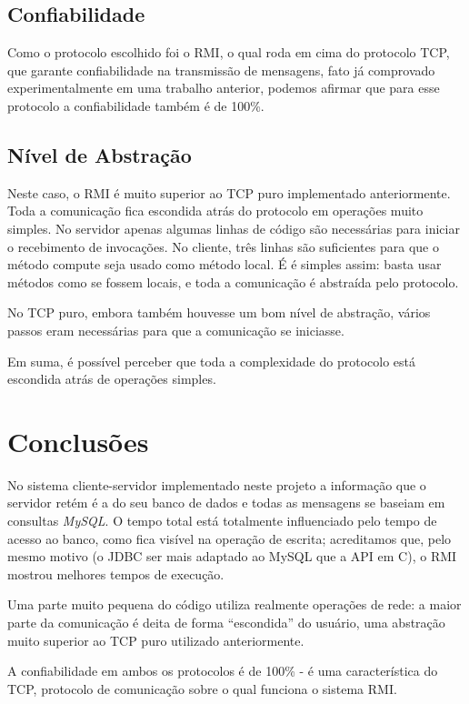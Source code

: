 \documentclass[12pt,a4paper]{article}
\begin{document}
\subsection{Confiabilidade}

Como o protocolo escolhido foi o RMI, o qual roda em cima do protocolo TCP, que garante confiabilidade na transmissão de mensagens, fato já comprovado experimentalmente em uma trabalho anterior, podemos afirmar que para esse protocolo a confiabilidade também é de 100\%. 

\subsection{Nível de Abstração}

Neste caso, o RMI é muito superior ao TCP puro implementado anteriormente. Toda a comunicação fica escondida atrás do protocolo em operações muito simples. No servidor apenas algumas linhas de código são necessárias para iniciar o recebimento de invocações. No cliente, três linhas são suficientes para que o método compute seja usado como método local. É é simples assim: basta usar métodos como se fossem locais, e toda a comunicação é abstraída pelo protocolo.

No TCP puro, embora também houvesse um bom nível de abstração, vários passos eram necessárias para que a comunicação se iniciasse.

Em suma, é possível perceber que toda a complexidade do protocolo está escondida atrás de operações simples.

\section{Conclusões}

No sistema cliente-servidor implementado neste projeto a informação que o servidor retém é a do seu banco de dados e todas as mensagens se baseiam em consultas {\it MySQL}. O tempo total está totalmente influenciado pelo tempo de acesso ao banco, como fica visível na operação de escrita; acreditamos que, pelo mesmo motivo (o JDBC ser mais adaptado ao MySQL que a API em C), o RMI mostrou melhores tempos de execução.

Uma parte muito pequena do código utiliza realmente operações de rede: a maior parte da comunicação é deita de forma ``escondida'' do usuário, uma abstração muito superior ao TCP puro utilizado anteriormente.

A confiabilidade em ambos os protocolos é de 100\% - é uma característica do TCP, protocolo de comunicação sobre o qual funciona o sistema RMI.


\singlespace


\end{document}
